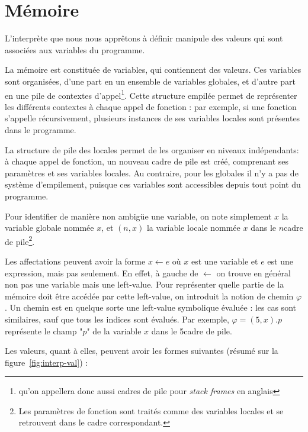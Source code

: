 \section{Mémoire}

L'interprète que nous nous apprêtons à définir manipule des valeurs qui sont
associées aux variables du programme.

La mémoire est constituée de variables, qui contiennent des valeurs. Ces
variables sont organisées, d'une part en un ensemble de variables globales, et
d'autre part en une pile de contextes d'appel\footnote{qu'on appellera donc
aussi cadres de pile pour \emph{stack frames} en anglais}. Cette structure
empilée permet de représenter les différents contextes à chaque appel de
fonction : par exemple, si une fonction s'appelle récursivement, plusieurs
instances de ses variables locales sont présentes dans le programme.

La structure de pile des locales permet de les organiser en niveaux
indépendants: à chaque appel de fonction, un nouveau cadre de pile est créé,
comprenant ses paramètres et ses variables locales. Au contraire, pour les
globales il n'y a pas de système d'empilement, puisque ces variables sont
accessibles depuis tout point du programme.

Pour identifier de manière non ambigüe une variable, on note simplement $x$ la
variable globale nommée $x$, et $(n, x)$ la variable locale nommée $x$ dans le
$n$\ieme cadre de pile\footnote{Les paramètres de fonction sont traités comme
des variables locales et se retrouvent dans le cadre correspondant.}.

Les affectations peuvent avoir la forme $x ← e$ où $x$ est une variable et $e$
est une expression, mais pas seulement. En effet, à gauche de $←$ on trouve en
général non pas une variable mais une left-value. Pour représenter quelle partie
de la mémoire doit être accédée par cette left-value, on introduit la notion de
chemin $φ$. Un chemin est en quelque sorte une left-value symbolique évaluée :
les cas sont similaires, sauf que tous les indices sont évalués. Par exemple, $φ
= (5, x).p$ représente le champ "$p$" de la variable $x$ dans le 5\ieme cadre de
pile.

Les valeurs, quant à elles, peuvent avoir les formes suivantes (résumé sur la
figure~\ref{fig:interp-val}) :

